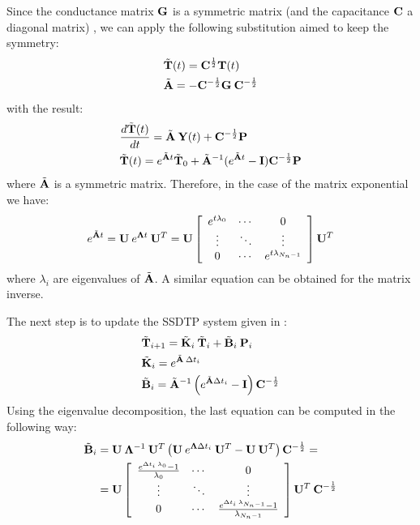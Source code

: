Since the conductance matrix $\mathbf{G}$ is a symmetric matrix (and the capacitance $\mathbf{C}$ a diagonal matrix) \cite{rao2009, huang2008}, we can apply the following substitution aimed to keep the symmetry:
\begin{align}
  & \tilde{\mathbf{T}}(t) = \mathbf{C}^{\frac{1}{2}} \mathbf{T}(t) \label{eq:substitution} \\
  & \tilde{\mathbf{A}} = -\mathbf{C}^{-\frac{1}{2}} \mathbf{G} \: \mathbf{C}^{-\frac{1}{2}} \nonumber
\end{align}
with the result:
\begin{align*}
  & \frac{d\tilde{\mathbf{T}}(t)}{dt} = \tilde{\mathbf{A}} \: \mathbf{Y}(t) + \mathbf{C}^{-\frac{1}{2}} \mathbf{P} \\
  & \tilde{\mathbf{T}}(t) = e^{\tilde{\mathbf{A}} t} \tilde{\mathbf{T}}_0 + \tilde{\mathbf{A}}^{-1} (e^{\tilde{\mathbf{A}} t} - \mathbf{I}) \mathbf{C}^{-\frac{1}{2}} \mathbf{P}
\end{align*}
where $\tilde{\mathbf{A}}$ is a symmetric matrix. Therefore, in the case of the matrix exponential we have:
\begin{equation} \label{eq:matrix-exponential}
  e^{\tilde{\mathbf{A}} t} = \mathbf{U} \: e^{\mathbf{\Lambda} t} \: \mathbf{U}^T = \mathbf{U} \left[
      \begin{array}{ccc}
        e^{t \lambda_0} & \cdots & 0 \\
        \vdots & \ddots & \vdots \\
        0 & \cdots & e^{t \lambda_{N_n - 1}}
      \end{array}
    \right] \mathbf{U}^T
\end{equation}
where $\lambda_i$ are eigenvalues of $\tilde{\mathbf{A}}$. A similar equation can be obtained for the matrix inverse.

The next step is to update the SSDTP system given in :
\begin{align}
  & \tilde{\mathbf{T}}_{i+1} = \tilde{\mathbf{K}}_i \: \tilde{\mathbf{T}}_i + \tilde{\mathbf{B}}_i \: \mathbf{P}_i \label{eq:recurrent-equation} \\
  & \tilde{\mathbf{K}}_i = e^{\tilde{\mathbf{A}} \: \Delta t_i} \nonumber \\
  & \tilde{\mathbf{B}}_i = \tilde{\mathbf{A}}^{-1} \left( e^{\tilde{\mathbf{A}} \Delta t_i} - \mathbf{I} \right) \mathbf{C}^{-\frac{1}{2}} \nonumber
\end{align}
Using the eigenvalue decomposition, the last equation can be computed in the following way:
\begin{align*}
  \tilde{\mathbf{B}}_i & = \mathbf{U} \: \mathbf{\Lambda}^{-1} \: \mathbf{U}^T \left(\mathbf{U} \: e^{\mathbf{\Lambda} \Delta t_i} \: \mathbf{U}^T - \mathbf{U} \: \mathbf{U}^T \right) \mathbf{C}^{-\frac{1}{2}} = \\
      & = \mathbf{U} \left[
        \begin{array}{ccc}
          \frac{e^{\Delta t_i \: \lambda_0} - 1}{\lambda_0} & \cdots & 0 \\
          \vdots & \ddots & \vdots \\
          0 & \cdots & \frac{e^{\Delta t_i \: \lambda_{N_n - 1}} - 1}{\lambda_{N_n - 1}}
        \end{array}
      \right] \mathbf{U}^T \: \mathbf{C}^{-\frac{1}{2}}
\end{align*}

